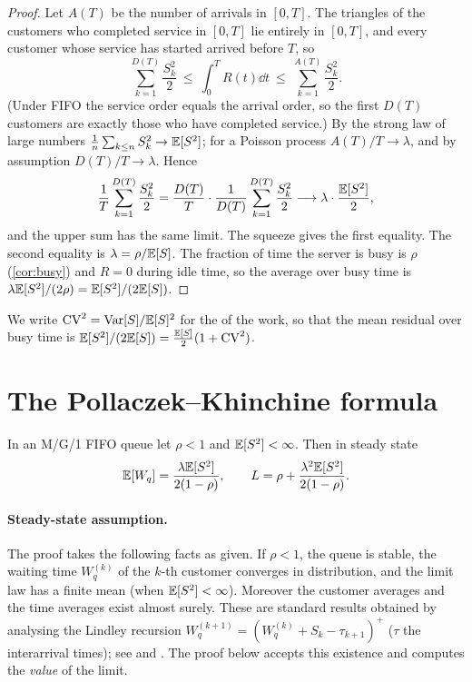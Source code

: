\begin{proof}
Let $A(T)$ be the number of arrivals in $[0,T]$. The triangles of the customers
who completed service in $[0,T]$ lie entirely in $[0,T]$, and every customer
whose service has started arrived before $T$, so
\[
  \sum_{k=1}^{D(T)}\frac{S_k^2}{2}\ \le\ \int_0^T R(t)\dd t\ \le\ \sum_{k=1}^{A(T)}\frac{S_k^2}{2}.
\]
(Under FIFO the service order equals the arrival order, so the first $D(T)$
customers are exactly those who have completed service.) By the strong law of
large numbers $\frac1n\sum_{k\le n}S_k^2\to\mathbb{E}[S^2]$; for a Poisson process
$A(T)/T\to\lambda$, and by assumption $D(T)/T\to\lambda$. Hence
\[
  \frac1T\sum_{k=1}^{D(T)}\frac{S_k^2}{2}
  =\frac{D(T)}{T}\cdot\frac{1}{D(T)}\sum_{k=1}^{D(T)}\frac{S_k^2}{2}
  \longrightarrow\lambda\cdot\frac{\mathbb{E}[S^2]}{2},
\]
and the upper sum has the same limit. The squeeze gives the first equality. The
second equality is $\lambda=\rho/\mathbb{E}[S]$. The fraction of time the server is busy
is $\rho$ (\cref{cor:busy}) and $R=0$ during idle time, so the average over busy
time is $\lambda\mathbb{E}[S^2]/(2\rho)=\mathbb{E}[S^2]/(2\mathbb{E}[S])$.
\end{proof}

We write $\mathrm{CV}^2=\operatorname{Var}[S]/\mathbb{E}[S]^2$ for the 
of the work, so that the mean residual over busy time is
$\mathbb{E}[S^2]/(2\mathbb{E}[S])=\frac{\mathbb{E}[S]}{2}(1+\mathrm{CV}^2)$.

\section{The Pollaczek--Khinchine formula}

\begin{theorem}\label{thm:pk}
In an M/G/1 FIFO queue let $\rho<1$ and $\mathbb{E}[S^2]<\infty$. Then in steady state
\begin{equation}\label{L3:eq:pk}
  \mathbb{E}[W_q]=\frac{\lambda\mathbb{E}[S^2]}{2(1-\rho)},\qquad
  L=\rho+\frac{\lambda^2\mathbb{E}[S^2]}{2(1-\rho)}.
\end{equation}
\end{theorem}

\paragraph{Steady-state assumption.} The proof takes the following facts as
given. If $\rho<1$, the queue is stable, the waiting time $W_q^{(k)}$ of the
$k$-th customer converges in distribution, and the limit law has a finite mean
(when $\mathbb{E}[S^2]<\infty$). Moreover the customer averages and the time averages
exist almost surely. These are standard results obtained by analysing the
Lindley recursion $W^{(k+1)}_q=(W^{(k)}_q+S_k-\tau_{k+1})^+$ ($\tau$ the
interarrival times); see \cite[Ch.~3, 10]{asmussen2003} and
\cite[Ch.~5]{kleinrock1975}. The proof below accepts this existence and computes
the \emph{value} of the limit.

